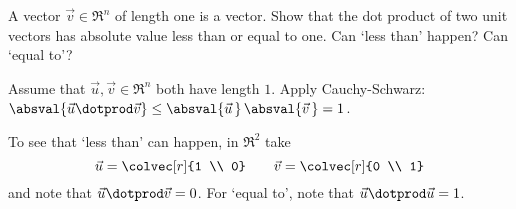 
\begin{Exercise}[
name={},
title={}, 
difficulty=0,
origin={\cite{JH}}]
    A vector \( \vec{v}\in\Re^n \) of length one is a
     vector.
    Show that the dot product of two unit vectors has absolute value
    less than or equal to one.
    Can `less than' happen?
    Can `equal to'?
\end{Exercise}

\begin{Answer}
      Assume that \( \vec{u},\vec{v}\in\Re^n \) both have length \( 1 \).
      Apply Cauchy-Schwarz:
      $\absval{\vec{u}\dotprod\vec{v}}
             \leq\absval{\vec{u}\,}\,\absval{\vec{v}\,}=1$.

      To see that `less than' can happen, in \( \Re^2 \) take
      \begin{equation*}
        \vec{u}=\colvec[r]{1 \\ 0}
        \qquad
        \vec{v}=\colvec[r]{0 \\ 1}
      \end{equation*}
      and note that \( \vec{u}\dotprod\vec{v}=0 \).
      For `equal to', note that \( \vec{u}\dotprod\vec{u}=1 \).  
\end{Answer}

